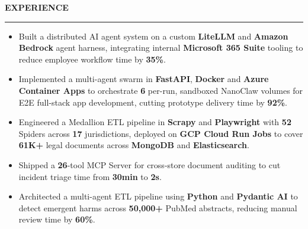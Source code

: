 \documentclass[11pt, letterpaper]{article}
\newcommand\sectionTitle[1]{%
    \begingroup
        \textbf{\MakeUppercase{#1}}
        \vspace{0.4em}
        \hrule
        \vspace{-0.3em}
    \endgroup
}%
\newenvironment{experienceSection}[1]{%
    \sectionTitle{#1}%
    \begin{list}{}{ %
        \setlength{\leftmargin}{0em} %
    }%
        \item[]%
    }{%
    \end{list}%
}%
\begin{document}
\begin{experienceSection}{Experience}

    \experienceItem[
        company={Temasek},
        location={Singapore},
        position={Full Stack Engineering Intern},
        duration={Aug. 2026 - Dec. 2026}
    ]
    \begin{itemize}
        \setlength{\itemsep}{-6pt}
        \item Built a distributed AI agent system on a custom \textbf{LiteLLM} and \textbf{Amazon Bedrock} agent harness, integrating internal \textbf{Microsoft 365 Suite} tooling to reduce employee workflow time by \textbf{35\%}.
    \end{itemize}

    \experienceItem[
        company={Ministry of Home Affairs},
        location={Singapore},
        position={Artificial Intelligence Engineering Intern},
        duration={May. 2026 - Jul. 2026}
    ]
    \begin{itemize}
        \setlength{\itemsep}{-6pt}
        \item Implemented a multi-agent swarm in \textbf{FastAPI}, \textbf{Docker} and \textbf{Azure Container Apps} to orchestrate \textbf{6} per-run, sandboxed NanoClaw volumes for E2E full-stack app development, cutting prototype delivery time by \textbf{92\%}.
    \end{itemize}

    \experienceItem[
        company={Elefant},
        location={Singapore},
        position={Full Stack Engineering Intern},
        duration={Jan. 2026 - May. 2026}
    ]
    \begin{itemize}
        \setlength{\itemsep}{-6pt}
        \item Engineered a Medallion ETL pipeline in \textbf{Scrapy} and \textbf{Playwright} with \textbf{52} Spiders across \textbf{17} jurisdictions, deployed on \textbf{GCP Cloud Run Jobs} to cover \textbf{61K+} legal documents across \textbf{MongoDB} and \textbf{Elasticsearch}.
        \item Shipped a \textbf{26}-tool MCP Server for cross-store document auditing to cut incident triage time from \textbf{30min} to \textbf{2s}.
    \end{itemize}

    \experienceItem[
        company={WhyHow.AI},
        location={San Francisco},
        position={Backend Development Intern},
        duration={Aug. 2025 - Dec. 2025}
    ]
    \begin{itemize}
        \setlength{\itemsep}{-6pt}
        \item Architected a multi-agent ETL pipeline using \textbf{Python} and \textbf{Pydantic AI} to detect emergent harms across \textbf{50,000+} PubMed abstracts, reducing manual review time by \textbf{60\%}.
    \end{itemize}


\end{experienceSection}
\end{document}
